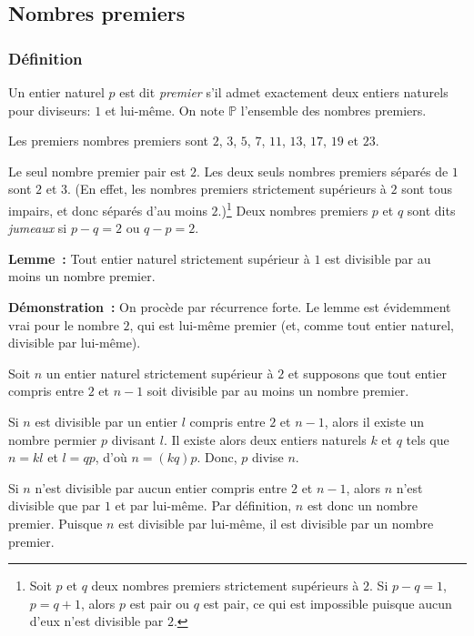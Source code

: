 \subsection{Nombres premiers}

\subsubsection{Définition}
\label{subsub:defNombresPremiers}

Un entier naturel $p$ est dit \textit{premier} s'il admet exactement deux entiers naturels pour diviseurs: $1$ et lui-même.
On note $\mathbb{P}$ l'ensemble des nombres premiers.

Les premiers nombres premiers sont $2$, $3$, $5$, $7$, $11$, $13$, $17$, $19$ et $23$.

Le seul nombre premier pair est $2$. 
Les deux seuls nombres premiers séparés de $1$ sont $2$ et $3$. 
(En effet, les nombres premiers strictement supérieurs à $2$ sont tous impairs, et donc séparés d'au moins $2$.)\footnote{Soit $p$ et $q$ deux nombres premiers strictement supérieurs à $2$. Si $p-q=1$, $p=q+1$, alors $p$ est pair ou $q$ est pair, ce qui est impossible puisque aucun d'eux n'est divisible par $2$.}
Deux nombres premiers $p$ et $q$ sont dits \textit{jumeaux} si $p-q=2$ ou $q-p=2$. 

\bigskip

\noindent\textbf{Lemme :} Tout entier naturel strictement supérieur à $1$ est divisible par au moins un nombre premier.

\medskip

\noindent\textbf{Démonstration :} On procède par récurrence forte. 
Le lemme est évidemment vrai pour le nombre $2$, qui est lui-même premier (et, comme tout entier naturel, divisible par lui-même). 

Soit $n$ un entier naturel strictement supérieur à $2$ et supposons que tout entier compris entre $2$ et $n-1$ soit divisible par au moins un nombre premier. 

Si $n$ est divisible par un entier $l$ compris entre $2$ et $n-1$, alors il existe un nombre permier $p$ divisant $l$. 
Il existe alors deux entiers naturels $k$ et $q$ tels que $n = k l$ et $l = q p$, d'où $n = (k q) p$. 
Donc, $p$ divise $n$. 

Si $n$ n'est divisible par aucun entier compris entre $2$ et $n-1$, alors $n$ n'est divisible que par $1$ et par lui-même. 
Par définition, $n$ est donc un nombre premier. 
Puisque $n$ est divisible par lui-même, il est divisible par un nombre premier. 

